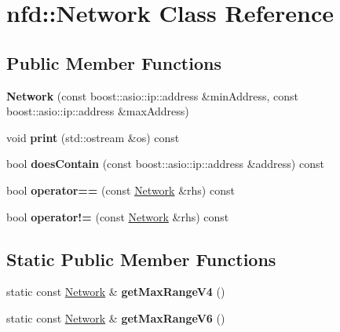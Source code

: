 \hypertarget{classnfd_1_1Network}{}\section{nfd\+:\+:Network Class Reference}
\label{classnfd_1_1Network}
\subsection*{Public Member Functions}
\begin{DoxyCompactItemize}
\item 
{\bfseries Network} (const boost\+::asio\+::ip\+::address \&min\+Address, const boost\+::asio\+::ip\+::address \&max\+Address)\hypertarget{classnfd_1_1Network_ac41b1b29280867530be8e9790395b8a9}{}\label{classnfd_1_1Network_ac41b1b29280867530be8e9790395b8a9}

\item 
void {\bfseries print} (std\+::ostream \&os) const\hypertarget{classnfd_1_1Network_a14c0577b9fdb1cae8ca585035b2458c5}{}\label{classnfd_1_1Network_a14c0577b9fdb1cae8ca585035b2458c5}

\item 
bool {\bfseries does\+Contain} (const boost\+::asio\+::ip\+::address \&address) const\hypertarget{classnfd_1_1Network_a818c261b07c0aa698502ca4836ace723}{}\label{classnfd_1_1Network_a818c261b07c0aa698502ca4836ace723}

\item 
bool {\bfseries operator==} (const \hyperlink{classnfd_1_1Network}{Network} \&rhs) const\hypertarget{classnfd_1_1Network_a11762f86483e7cd28aeca253bf09eb80}{}\label{classnfd_1_1Network_a11762f86483e7cd28aeca253bf09eb80}

\item 
bool {\bfseries operator!=} (const \hyperlink{classnfd_1_1Network}{Network} \&rhs) const\hypertarget{classnfd_1_1Network_ade9ecbd52e9e7b72fe67efedbdf0f1fd}{}\label{classnfd_1_1Network_ade9ecbd52e9e7b72fe67efedbdf0f1fd}

\end{DoxyCompactItemize}
\subsection*{Static Public Member Functions}
\begin{DoxyCompactItemize}
\item 
static const \hyperlink{classnfd_1_1Network}{Network} \& {\bfseries get\+Max\+Range\+V4} ()\hypertarget{classnfd_1_1Network_af46949d30f7a08dc1009eb7df6878504}{}\label{classnfd_1_1Network_af46949d30f7a08dc1009eb7df6878504}

\item 
static const \hyperlink{classnfd_1_1Network}{Network} \& {\bfseries get\+Max\+Range\+V6} ()\hypertarget{classnfd_1_1Network_ae93ae2533a47ecb17ac5b7d8d594db5d}{}\label{classnfd_1_1Network_ae93ae2533a47ecb17ac5b7d8d594db5d}

\end{DoxyCompactItemize}
